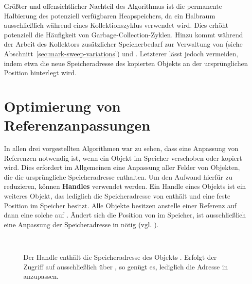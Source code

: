 Größter und offensichtlicher Nachteil des Algorithmus ist die permanente Halbierung des potenziell verfügbaren Heapspeichers, da ein Halbraum ausschließlich während eines Kollektionszyklus verwendet wird.
Dies erhöht potenziell die Häufigkeit von Garbage-Collection-Zyklen.
Hinzu kommt während der Arbeit des Kollektors zusätzlicher Speicherbedarf zur Verwaltung von  (siehe Abschnitt~\ref{sec:mark-sweep-variations}) und .
Letzterer lässt jedoch vermeiden, indem etwa die neue Speicheradresse des kopierten Objekts an der ursprünglichen Position hinterlegt wird.




\section{Optimierung von Referenzanpassungen}
\label{sec:handle}
In allen drei vorgestellten Algorithmen war zu sehen, dass eine Anpassung von Referenzen notwendig ist, wenn ein Objekt im Speicher verschoben oder kopiert wird.
Dies erfordert im Allgemeinen eine Anpassung aller Felder von Objekten, die die ursprüngliche Speicheradresse enthalten.
Um den Aufwand hierfür zu reduzieren, können \textbf{Handles} verwendet werden.
Ein Handle  eines Objekts  ist ein weiteres Objekt, das lediglich die Speicheradresse von  enthält und eine feste Position im Speicher besitzt.
Alle Objekte besitzen anstelle einer Referenz auf  dann eine solche auf .
Ändert sich die Position von  im Speicher, ist ausschließlich eine Anpassung der Speicheradresse in  nötig (vgl. \cite{brooks1984}).

\begin{figure}[h]
	\centering
	~\hspace{1cm}~
	
	\caption[Handle zur indirekten Adressierung von Objekten]{Der Handle  enthält die Speicheradresse des Objekts . Erfolgt der Zugriff auf  ausschließlich über , so genügt es, lediglich die Adresse in  anzupassen.}
	\label{fig:handle}
\end{figure}

